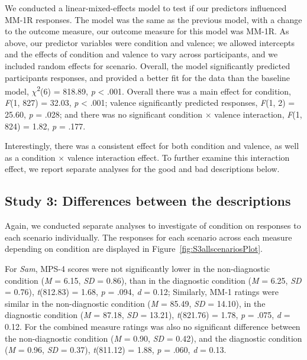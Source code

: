 \documentclass[
  man,floatsintext]{apa6}
\begin{document}
We conducted a linear-mixed-effects model to test if our predictors influenced MM-1R responses. The model was the same as the previous model, with a change to the outcome measure, our outcome measure for this model was MM-1R. As above, our predictor variables were condition and valence; we allowed intercepts and the effects of condition and valence to vary across participants, and we included random effects for scenario.
Overall, the model significantly predicted participants responses, and provided a better fit for the data than the baseline model,
\(\chi\)\textsuperscript{2}(6) = 818.89, \emph{p} \textless{} .001.
Overall there was a main effect for condition,
\emph{F}(1, 827) = 32.03, \emph{p} \textless{} .001;
valence significantly predicted responses,
\emph{F}(1, 2) = 25.60, \emph{p} = .028;
and there was no significant condition \(\times\) valence interaction,
\emph{F}(1, 824) = 1.82, \emph{p} = .177.

Interestingly, there was a consistent effect for both condition and valence, as well as a condition \(\times\) valence interaction effect. To further examine this interaction effect, we report separate analyses for the good and bad descriptions below.

\subsection{Study 3: Differences between the descriptions}\label{study-3-differences-between-the-descriptions}

Again, we conducted separate analyses to investigate of condition on responses to each scenario individually. The responses for each scenario across each measure depending on condition are displayed in Figure~\ref{fig:S3allscenariosPlot}.

For \emph{Sam}, MPS-4 scores were not significantly lower in the non-diagnostic condition (\emph{M} = 6.15, \emph{SD} = 0.86), than in the diagnostic condition (\emph{M} = 6.25, \emph{SD} = 0.76), \emph{t}(812.83) = 1.68, \emph{p} = .094, \emph{d} = 0.12; Similarly, MM-1 ratings were similar in the non-diagnostic condition (\emph{M} = 85.49, \emph{SD} = 14.10), in the diagnostic condition (\emph{M} = 87.18, \emph{SD} = 13.21), \emph{t}(821.76) = 1.78, \emph{p} = .075, \emph{d} = 0.12. For the combined measure ratings was also no significant difference between the non-diagnostic condition (\emph{M} = 0.90, \emph{SD} = 0.42), and the diagnostic condition (\emph{M} = 0.96, \emph{SD} = 0.37), \emph{t}(811.12) = 1.88, \emph{p} = .060, \emph{d} = 0.13.
\end{document}
